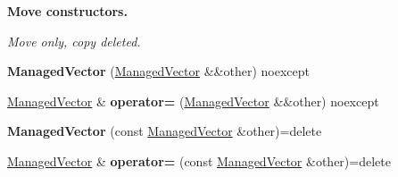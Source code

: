 \begin{Indent}\textbf{ Move constructors.}\par
{\em Move only, copy deleted. }\begin{DoxyCompactItemize}
\item 
\mbox{\label{classblaze_1_1util_1_1ManagedVector_3_01T_00_01false_01_4_a1c05e0126e5d27527d34b49a536d2304}} 
{\bfseries Managed\+Vector} (\hyperlink{classblaze_1_1util_1_1ManagedVector}{Managed\+Vector} \&\&other) noexcept
\item 
\mbox{\label{classblaze_1_1util_1_1ManagedVector_3_01T_00_01false_01_4_aa5ca13286e8621228ca6272f3a3c60ce}} 
\hyperlink{classblaze_1_1util_1_1ManagedVector}{Managed\+Vector} \& {\bfseries operator=} (\hyperlink{classblaze_1_1util_1_1ManagedVector}{Managed\+Vector} \&\&other) noexcept
\item 
\mbox{\label{classblaze_1_1util_1_1ManagedVector_3_01T_00_01false_01_4_a31ea86ae218abd960a52a27bc5cb5b82}} 
{\bfseries Managed\+Vector} (const \hyperlink{classblaze_1_1util_1_1ManagedVector}{Managed\+Vector} \&other)=delete
\item 
\mbox{\label{classblaze_1_1util_1_1ManagedVector_3_01T_00_01false_01_4_a7bddc0119df5562d05756938539216b1}} 
\hyperlink{classblaze_1_1util_1_1ManagedVector}{Managed\+Vector} \& {\bfseries operator=} (const \hyperlink{classblaze_1_1util_1_1ManagedVector}{Managed\+Vector} \&other)=delete
\end{DoxyCompactItemize}
\end{Indent}
